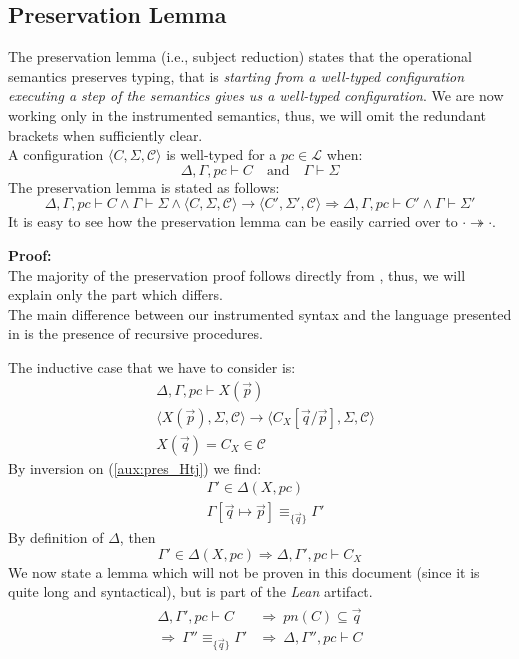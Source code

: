 \documentclass[12pt,a4paper,twoside]{book}
\newcommand{\MCL}{\mathscr{L}}
\begin{document}
\subsection{Preservation Lemma}
The preservation lemma (i.e., subject reduction) states that the operational semantics preserves typing, that is \emph{starting from a well-typed configuration executing a step of the semantics gives us a well-typed configuration}.
We are now working only in the instrumented semantics, thus, we will omit the redundant brackets when sufficiently clear.\\
A configuration
$\langle C, \Sigma, \mathscr{C}\rangle$ is well-typed for a $pc \in \MCL$ when:
$$\Delta, \Gamma, pc \vdash C \quad \text{and}\quad \Gamma \vdash \Sigma$$
The preservation lemma is stated as follows:
\begin{equation}\label{aux:pres}
\Delta, \Gamma, pc \vdash C \land \Gamma \vdash \Sigma \land 
\langle C, \Sigma, \mathscr{C}\rangle \rightarrow
\langle C', \Sigma', \mathscr{C}\rangle \Rightarrow 
\Delta, \Gamma, pc \vdash C' \land \Gamma \vdash \Sigma'
\end{equation}
It is easy to see how the preservation lemma can be easily carried over to $\cdot \twoheadrightarrow \cdot$.

\medskip
\noindent\textbf{Proof:}\\
The majority of the preservation proof follows directly from \cite{myers2011proving}, thus, we will explain only the part which differs.\\
The main difference between our instrumented syntax and the language presented in \cite{myers2011proving} is the presence of recursive procedures.

The inductive case that we have to consider is:
\begin{align}
	&\Delta,\Gamma,pc \vdash X(\vec{p})\label{aux:pres_Htj}\tag{H1}\\
	&\langle X(\vec{p}), \Sigma, \mathscr{C}\rangle \rightarrow
	\langle C_X[\vec{q}/\vec{p}], \Sigma, \mathscr{C}\rangle\label{aux:pres_Hlto}\tag{H2}\\
	&X(\vec{q}) = C_X \in \mathscr{C}\label{aux:pres_Hlook}\tag{H3}
\end{align}
By inversion on (\ref{aux:pres_Htj}) we find:
\begin{align}
	&\Gamma' \in \Delta(X,pc) \label{aux:pres_Htj1}\tag{H11}\\
	&\Gamma[\vec{q}\mapsto \vec{p}] \equiv_{\{\vec{q}\}} \Gamma'\label{aux:pres_Htj2}\tag{H12}
\end{align}
By definition of $\Delta$, then
$$
\Gamma' \in \Delta(X,pc) \Rightarrow \Delta, \Gamma', pc \vdash C_X
$$
We now state a lemma which will not be proven in this document (since it is quite long and syntactical), but is part of the \emph{Lean} artifact.
\begin{align*}\label{aux:pres_lemma2}
\begin{split}
	\Delta, \Gamma', pc \vdash C 
	&\Rightarrow~ pn(C) \subseteq \vec{q}\\
	\Rightarrow~ \Gamma'' \equiv_{\{\vec{q}\}} \Gamma'
	&\Rightarrow~ \Delta, \Gamma'', pc \vdash C
\end{split}
\end{align*}
\end{document}

